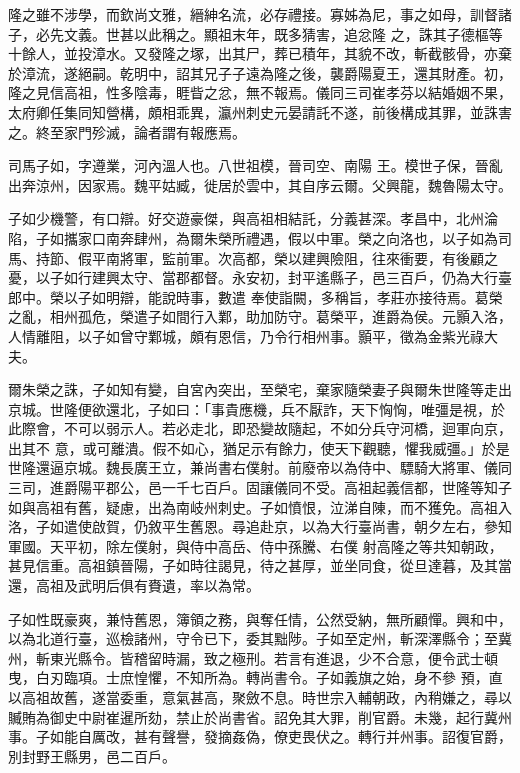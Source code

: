 \begin{pinyinscope}
 隆之雖不涉學，而欽尚文雅，縉紳名流，必存禮接。寡姊為尼，事之如母，訓督諸子，必先文義。世甚以此稱之。顯祖末年，既多猜害，追忿隆
 之，誅其子德樞等十餘人，並投漳水。又發隆之塚，出其尸，葬已積年，其貌不改，斬截骸骨，亦棄於漳流，遂絕嗣。乾明中，詔其兄子子遠為隆之後，襲爵陽夏王，還其財產。初，隆之見信高祖，性多陰毒，睚眥之忿，無不報焉。儀同三司崔孝芬以結婚姻不果，太府卿任集同知營構，頗相乖異，瀛州刺史元晏請託不遂，前後構成其罪，並誅害之。終至家門殄滅，論者謂有報應焉。



 司馬子如，字遵業，河內溫人也。八世祖模，晉司空、南陽
 王。模世子保，晉亂出奔涼州，因家焉。魏平姑臧，徙居於雲中，其自序云爾。父興龍，魏魯陽太守。



 子如少機警，有口辯。好交遊豪傑，與高祖相結託，分義甚深。孝昌中，北州淪陷，子如攜家口南奔肆州，為爾朱榮所禮遇，假以中軍。榮之向洛也，以子如為司馬、持節、假平南將軍，監前軍。次高都，榮以建興險阻，往來衝要，有後顧之憂，以子如行建興太守、當郡都督。永安初，封平遙縣子，邑三百戶，仍為大行臺郎中。榮以子如明辯，能說時事，數遣
 奉使詣闕，多稱旨，孝莊亦接待焉。葛榮之亂，相州孤危，榮遣子如間行入鄴，助加防守。葛榮平，進爵為侯。元顥入洛，人情離阻，以子如曾守鄴城，頗有恩信，乃令行相州事。顥平，徵為金紫光祿大夫。



 爾朱榮之誅，子如知有變，自宮內突出，至榮宅，棄家隨榮妻子與爾朱世隆等走出京城。世隆便欲還北，子如曰：「事貴應機，兵不厭詐，天下恟恟，唯彊是視，於此際會，不可以弱示人。若必走北，即恐變故隨起，不如分兵守河橋，迴軍向京，出其不
 意，或可離潰。假不如心，猶足示有餘力，使天下觀聽，懼我威彊。」於是世隆還逼京城。魏長廣王立，兼尚書右僕射。前廢帝以為侍中、驃騎大將軍、儀同三司，進爵陽平郡公，邑一千七百戶。固讓儀同不受。高祖起義信都，世隆等知子如與高祖有舊，疑慮，出為南岐州刺史。子如憤恨，泣涕自陳，而不獲免。高祖入洛，子如遣使啟賀，仍敘平生舊恩。尋追赴京，以為大行臺尚書，朝夕左右，參知軍國。天平初，除左僕射，與侍中高岳、侍中孫騰、右僕
 射高隆之等共知朝政，甚見信重。高祖鎮晉陽，子如時往謁見，待之甚厚，並坐同食，從旦達暮，及其當還，高祖及武明后俱有賚遺，率以為常。



 子如性既豪爽，兼恃舊恩，簿領之務，與奪任情，公然受納，無所顧憚。興和中，以為北道行臺，巡檢諸州，守令已下，委其黜陟。子如至定州，斬深澤縣令；至冀州，斬東光縣令。皆稽留時漏，致之極刑。若言有進退，少不合意，便令武士頓曳，白刃臨項。士庶惶懼，不知所為。轉尚書令。子如義旗之始，身不參
 預，直以高祖故舊，遂當委重，意氣甚高，聚斂不息。時世宗入輔朝政，內稍嫌之，尋以贓賄為御史中尉崔暹所劾，禁止於尚書省。詔免其大罪，削官爵。未幾，起行冀州事。子如能自厲改，甚有聲譽，發摘姦偽，僚吏畏伏之。轉行并州事。詔復官爵，別封野王縣男，邑二百戶。




\end{pinyinscope}
